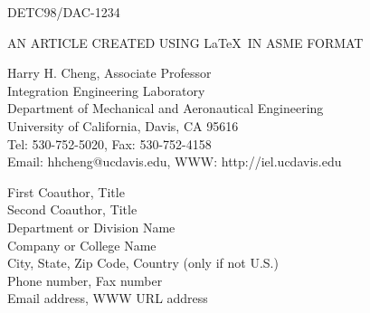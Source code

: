 \documentclass[11pt]{article}
\begin{document}

\setlength{\baselineskip}{10pt}
{\scriptsize{\hvb
\begin{flushright}
DETC98/DAC-1234      %
\end{flushright}
}}

\begin{center}
{\footnotesize{\hvb
AN ARTICLE CREATED USING \LaTeX\ IN ASME FORMAT\\
}}

\vspace{10pt}
\setlength{\baselineskip}{11pt}

{\footnotesize
{\hvb Harry H. Cheng}, {\hv Associate Professor} \\
{\hv
Integration Engineering Laboratory\\
Department of Mechanical and Aeronautical Engineering \\
University of California, Davis, CA 95616\\
Tel: 530-752-5020, Fax: 530-752-4158\\ 
Email: hhcheng@ucdavis.edu, WWW: http://iel.ucdavis.edu\\
}}

\vspace{10pt}
{\footnotesize
{\hvb First Coauthor}, {\hv Title} \\
{\hvb Second Coauthor}, {\hv Title} \\
{\hv
Department or Division Name \\
Company or College Name\\
City, State, Zip Code, Country (only if not U.S.)\\
Phone number, Fax number \\ 
Email address, WWW URL address\
}}


\end{center}
\end{document}
